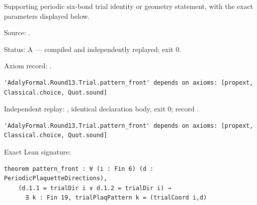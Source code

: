 \begin{theorem}[bp-385]
\label{bp-385}
\leanok
Supporting periodic six-bond trial identity or geometry statement, with the exact parameters displayed below.

\par Source: \texttt{}.
\par Status: A — compiled and independently replayed; exit 0.
\par Axiom record: \texttt{}.
\begin{verbatim}
'AdalyFormal.Round13.Trial.pattern_front' depends on axioms: [propext, Classical.choice, Quot.sound]
\end{verbatim}
\par Independent replay: \texttt{}, identical declaration body, exit 0; record \texttt{}.
\begin{verbatim}
'AdalyFormal.Round13.Trial.pattern_front' depends on axioms: [propext, Classical.choice, Quot.sound]
\end{verbatim}
\par Exact Lean signature:
\begin{verbatim}
theorem pattern_front : ∀ (i : Fin 6) (d : PeriodicPlaquetteDirections),
    (d.1.1 = trialDir i ∨ d.1.2 = trialDir i) →
      ∃ k : Fin 19, trialPlaqPattern k = (trialCoord i,d)
\end{verbatim}
\end{theorem}

